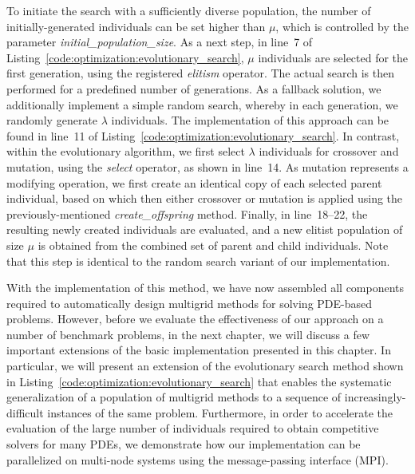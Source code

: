 To initiate the search with a sufficiently diverse population, the number of initially-generated individuals can be set higher than $\mu$, which is controlled by the parameter \emph{initial\_population\_size}.
As a next step, in line~7 of Listing~\ref{code:optimization:evolutionary_search}, $\mu$ individuals are selected for the first generation, using the registered \emph{elitism} operator.
The actual search is then performed for a predefined number of generations.
As a fallback solution, we additionally implement a simple random search, whereby in each generation, we randomly generate $\lambda$ individuals.
The implementation of this approach can be found in line~11 of Listing~\ref{code:optimization:evolutionary_search}.
In contrast, within the evolutionary algorithm, we first select $\lambda$ individuals for crossover and mutation, using the \emph{select} operator, as shown in line~14.
As mutation represents a modifying operation, we first create an identical copy of each selected parent individual, based on which then either crossover or mutation is applied using the previously-mentioned \emph{create\_offspring} method.
Finally, in line~18--22, the resulting newly created individuals are evaluated, and a new elitist population of size $\mu$ is obtained from the combined set of parent and child individuals.
Note that this step is identical to the random search variant of our implementation.

With the implementation of this method, we have now assembled all components required to automatically design multigrid methods for solving PDE-based problems.
However, before we evaluate the effectiveness of our approach on a number of benchmark problems, in the next chapter, we will discuss a few important extensions of the basic implementation presented in this chapter.
In particular, we will present an extension of the evolutionary search method shown in Listing~\ref{code:optimization:evolutionary_search} that enables the systematic generalization of a population of multigrid methods to a sequence of increasingly-difficult instances of the same problem.
Furthermore, in order to accelerate the evaluation of the large number of individuals required to obtain competitive solvers for many PDEs, we demonstrate how our implementation can be parallelized on multi-node systems using the message-passing interface (MPI).
